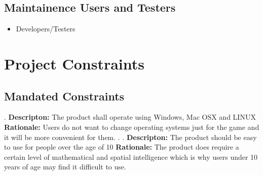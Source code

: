 \documentclass[12pt]{amsart}
\begin{document}
\subsection{Maintainence Users and Testers}
\begin{itemize}
\item Developers/Testers
\end{itemize}

\section{Project Constraints}
\subsection{Mandated Constraints}
.\newline
\textbf{Descripton:} The product shall operate using Windows, Mac OSX and LINUX
\textbf{Rationale:} Users do not want to change operating systems just for the game and it will be more convenient for them. 
.\newline
.\newline
\textbf{Descripton:} The product should be easy to use for people over the age of 10
\textbf{Rationale:} The product does require a certain level of mathematical and spatial intelligence which is why users under 10 years of age may find it difficult to use. 
\end{document}
